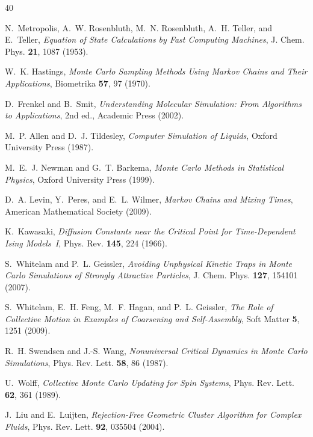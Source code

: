 \documentclass[twocolumn,10pt]{article}
\begin{document}
\begin{thebibliography}{40}

N.~Metropolis, A.~W. Rosenbluth, M.~N. Rosenbluth, A.~H. Teller, and
E.~Teller,
\textit{Equation of State Calculations by Fast Computing Machines},
J. Chem. Phys. \textbf{21}, 1087 (1953).

W.~K. Hastings,
\textit{Monte Carlo Sampling Methods Using Markov Chains and Their Applications},
Biometrika \textbf{57}, 97 (1970).

D.~Frenkel and B.~Smit,
\textit{Understanding Molecular Simulation: From Algorithms to Applications},
2nd ed., Academic Press (2002).

M.~P. Allen and D.~J. Tildesley,
\textit{Computer Simulation of Liquids},
Oxford University Press (1987).

M.~E.~J. Newman and G.~T. Barkema,
\textit{Monte Carlo Methods in Statistical Physics},
Oxford University Press (1999).

D.~A. Levin, Y.~Peres, and E.~L. Wilmer,
\textit{Markov Chains and Mixing Times},
American Mathematical Society (2009).

K.~Kawasaki,
\textit{Diffusion Constants near the Critical Point for Time-Dependent Ising
Models~I},
Phys. Rev. \textbf{145}, 224 (1966).

S.~Whitelam and P.~L. Geissler,
\textit{Avoiding Unphysical Kinetic Traps in Monte Carlo Simulations of
Strongly Attractive Particles},
J. Chem. Phys. \textbf{127}, 154101 (2007).

S.~Whitelam, E.~H. Feng, M.~F. Hagan, and P.~L. Geissler,
\textit{The Role of Collective Motion in Examples of Coarsening and Self-Assembly},
Soft Matter \textbf{5}, 1251 (2009).

R.~H. Swendsen and J.-S. Wang,
\textit{Nonuniversal Critical Dynamics in Monte Carlo Simulations},
Phys. Rev. Lett. \textbf{58}, 86 (1987).

U.~Wolff,
\textit{Collective Monte Carlo Updating for Spin Systems},
Phys. Rev. Lett. \textbf{62}, 361 (1989).

J.~Liu and E.~Luijten,
\textit{Rejection-Free Geometric Cluster Algorithm for Complex Fluids},
Phys. Rev. Lett. \textbf{92}, 035504 (2004).


\end{thebibliography}
\end{document}
